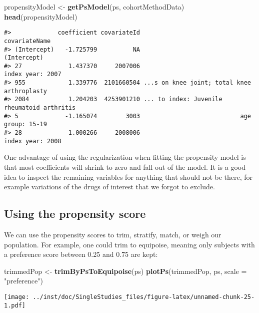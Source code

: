 \documentclass[]{article}
\newenvironment{Shaded}{\begin{snugshade}}{\end{snugshade}}
\newcommand{\DataTypeTok}[1]{\textcolor[rgb]{0.13,0.29,0.53}{#1}}
\newcommand{\KeywordTok}[1]{\textcolor[rgb]{0.13,0.29,0.53}{\textbf{#1}}}
\newcommand{\NormalTok}[1]{#1}
\newcommand{\StringTok}[1]{\textcolor[rgb]{0.31,0.60,0.02}{#1}}
\begin{document}
\begin{Shaded}
\begin{Highlighting}[]
\NormalTok{propensityModel <-}\StringTok{ }\KeywordTok{getPsModel}\NormalTok{(ps, cohortMethodData)}
\KeywordTok{head}\NormalTok{(propensityModel)}
\end{Highlighting}
\end{Shaded}

\begin{verbatim}
#>             coefficient covariateId                               covariateName
#> (Intercept)   -1.725799          NA                                 (Intercept)
#> 27             1.437370     2007006                            index year: 2007
#> 955            1.339776  2101660504 ...s on knee joint; total knee arthroplasty
#> 2084           1.204203  4253901210 ... to index: Juvenile rheumatoid arthritis
#> 5             -1.165074        3003                            age group: 15-19
#> 28             1.000266     2008006                            index year: 2008
\end{verbatim}

One advantage of using the regularization when fitting the propensity
model is that most coefficients will shrink to zero and fall out of the
model. It is a good idea to inspect the remaining variables for anything
that should not be there, for example variations of the drugs of
interest that we forgot to exclude.

\hypertarget{using-the-propensity-score}{%
\subsection{Using the propensity
score}\label{using-the-propensity-score}}

We can use the propensity scores to trim, stratify, match, or weigh our
population. For example, one could trim to equipoise, meaning only
subjects with a preference score between 0.25 and 0.75 are kept:

\begin{Shaded}
\begin{Highlighting}[]
\NormalTok{trimmedPop <-}\StringTok{ }\KeywordTok{trimByPsToEquipoise}\NormalTok{(ps)}
\KeywordTok{plotPs}\NormalTok{(trimmedPop, ps, }\DataTypeTok{scale =} \StringTok{"preference"}\NormalTok{)}
\end{Highlighting}
\end{Shaded}

\texttt{[image: ../inst/doc/SingleStudies\_files/figure-latex/unnamed-chunk-25-1.pdf]}
\end{document}
